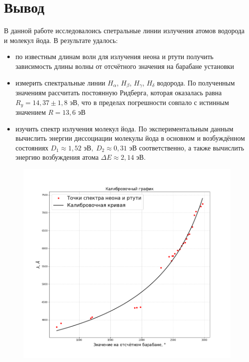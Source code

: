 \documentclass[a4paper,12pt]{article}
\begin{document}
\section{Вывод}
В данной работе исследовалоись спетральные линии излучения атомов водорода и молекул йода. В результате удалось:
\begin{itemize}
    \item
    по известным длинам волн для излучения неона и ртути получить зависимость длины волны от отсчётного значения на барабане установки
    \item
    измерить спектральные линии $H_\alpha$, $H_\beta$, $H_\gamma$, $H_\delta$ водорода. По полученным значениям рассчитать постоянную Ридберга, которая оказалась равна $R_y = 14,37 \pm 1,8$ эВ, что в пределах погрешности совпало с истинным значением $R = 13,6$ эВ
    \item
    изучить спектр излучения молекул йода. По экспериментальным данным вычислить энергии диссоциации молекулы йода в основном и возбуждённом состояниях $D_1 \approx 1,52 \text{ эВ},\; D_2 \approx 0,31 \text{ эВ}$ соответственно, а также вычислить энергию возбуждения атома $\Delta E \approx 2,14 \text{ эВ}$. 
    
\end{itemize}

\newpage
\begin{figure}[H]\label{fig: lambd via degree}
    \centering
    \includegraphics[width = \textwidth]{lambd(deg).png}
\end{figure}

\end{document}
